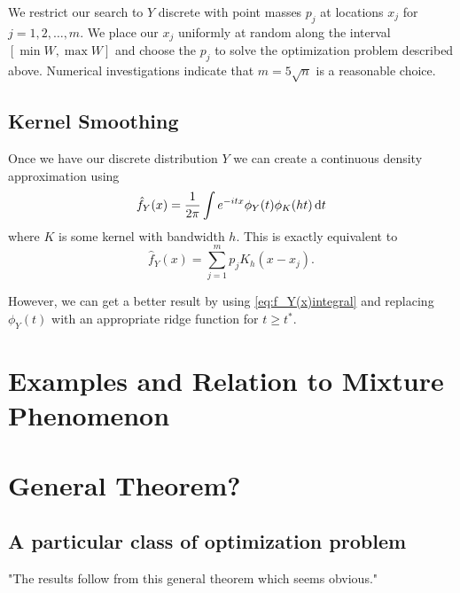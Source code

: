 		We restrict our search to $Y$ discrete with point masses $p_j$ at locations $x_j$ for $j = 1,2,\dots,m$. We place our $x_j$ uniformly at random along the interval $[\min W, \max W]$ and choose the $p_j$ to solve the optimization problem described above. Numerical investigations indicate that $m = 5 \sqrt{n}$ is a reasonable choice.

	\subsection{Kernel Smoothing}
		\label{ssec:KernelSmoothing}
		Once we have our discrete distribution $Y$ we can create a continuous density approximation using
		\begin{equation}
		\hat{f}_Y(x) = \frac{1}{2\pi} \int e^{-itx} \phi_Y(t) \phi_K(ht)  \, \mathrm{d} t
		\label{eq:f_Y(x)integral}
		\end{equation}
		where $K$ is some kernel with bandwidth $h$. This is exactly equivalent to
		\begin{equation}
		\hat{f}_Y(x) = \sum_{j=1}^m p_j K_h(x - x_j).
		\label{eq:f_Y(x)sum}
		\end{equation}

		However, we can get a better result by using \eqref{eq:f_Y(x)integral} and replacing $\phi_Y(t)$ with an appropriate ridge function for $t \geq t^*$.

\section{Examples and Relation to Mixture Phenomenon}

\section{General Theorem?}

\subsection{A particular class of optimization problem}
		"The results follow from this general theorem which seems obvious."

